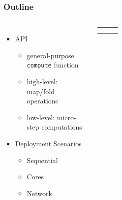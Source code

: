 \documentclass[xcolor=dvipsnames]{beamer}
\begin{document}

\begin{frame}\frametitle{Outline}
  \begin{columns}
    \begin{itemize}
    \item API
      \begin{itemize}
      \item general-purpose \texttt{compute} function
      \item high-level: map/fold operations
      \item low-level: micro-step computations
      \end{itemize}


\bigskip
    \item Deployment Scenarios
      \begin{itemize}
      \item Sequential
      \item Cores
      \item Network
      \end{itemize}
    \end{itemize}

  \begin{tabular}{|p{0.2em}|p{0.2em}|p{0.2em}|}
    \hline
    && \\\hline
    && \\\hline
    && \\\hline
  \end{tabular}
\end{columns}
\end{frame}

\end{document}
